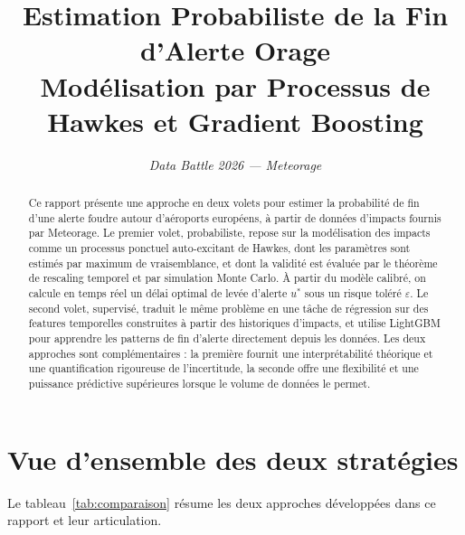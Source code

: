 \documentclass[a4paper,11pt]{article}
\title{\textbf{Estimation Probabiliste de la Fin d'Alerte Orage\\
\large Modélisation par Processus de Hawkes et Gradient Boosting}}
\author{}
\date{\textit{Data Battle 2026 --- Meteorage}}
\begin{document}
\maketitle

\begin{abstract}
Ce rapport présente une approche en deux volets pour estimer la probabilité de fin d'une alerte foudre autour d'aéroports européens, à partir de données d'impacts fournis par Meteorage. Le premier volet, probabiliste, repose sur la modélisation des impacts comme un processus ponctuel auto-excitant de Hawkes, dont les paramètres sont estimés par maximum de vraisemblance, et dont la validité est évaluée par le théorème de rescaling temporel et par simulation Monte Carlo. À partir du modèle calibré, on calcule en temps réel un délai optimal de levée d'alerte $u^*$ sous un risque toléré $\varepsilon$. Le second volet, supervisé, traduit le même problème en une tâche de régression sur des features temporelles construites à partir des historiques d'impacts, et utilise LightGBM pour apprendre les patterns de fin d'alerte directement depuis les données. Les deux approches sont complémentaires : la première fournit une interprétabilité théorique et une quantification rigoureuse de l'incertitude, la seconde offre une flexibilité et une puissance prédictive supérieures lorsque le volume de données le permet.
\end{abstract}

\tableofcontents
\newpage

\section{Vue d'ensemble des deux stratégies}

Le tableau~\ref{tab:comparaison} résume les deux approches développées dans ce rapport et leur articulation.
\end{document}

